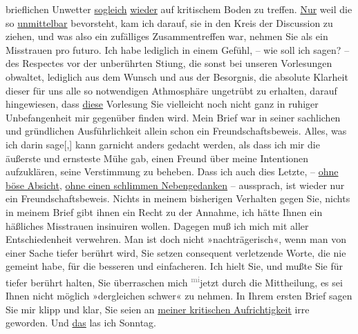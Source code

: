 \begin{ledgroupsized}[t]{13cm}
               brieflichen Unwetter \uline{sogleich}{ }\uline{wieder} auf kritischem Boden zu treffen. \uline{Nur} weil die \label{K_L03355-3v}\label{K_L03355-3h} so \uline{unmittelbar} bevorsteht, kam ich darauf,
               sie in den Kreis der Discussion zu ziehen, und was also ein zufälliges
               Zusammentreffen war, nehmen Sie als ein Misstrauen pro futuro.\pend
           \pstart
           Ich habe lediglich in einem Gefühl, – wie soll ich sagen? – des Respectes vor der
               unberührten Sti{\geminationm}ung, die sonst bei unseren Vorlesungen
               obwaltet, lediglich aus dem Wunsch und aus der Besorgnis, die absolute Klarheit
               dieser für uns alle so notwendigen Athmosphäre ungetrübt zu erhalten, darauf
               hingewiesen, dass \uline{diese} Vorlesung Sie vielleicht noch
               nicht ganz in ruhiger Unbefangenheit mir gegenüber finden wird.\pend
           \pstart
           Mein Brief war in seiner sachlichen und gründlichen Ausführlichkeit allein schon ein
               Freundschaftsbeweis. Alles, was ich darin sage{[},{]} kann garnicht
               anders gedacht werden, als dass ich mir die äußerste und ernsteste Mühe gab, einen
               Freund über meine {\pb}Intentionen
               aufzuklären, seine Verstimmung zu beheben. Dass ich auch dies Letzte, – \uline{ohne böse Absicht}, \uline{ohne
                  einen schlimmen Nebengedanken} – aussprach, ist wieder nur ein
               Freundschaftsbeweis. Nichts in meinem bisherigen Verhalten gegen Sie, nichts in
               meinem Brief gibt ihnen ein Recht zu der Annahme, ich hätte Ihnen ein häßliches
               Misstrauen insinuiren wollen. Dagegen muß ich mich mit aller Entschiedenheit
               verwehren.\pend
           \pstart
           Man ist doch nicht »nachträgerisch«, wenn man von einer Sache tiefer berührt wird,
               Sie setzen consequent verletzende Worte, die  nie
               gemeint habe, für die besseren und einfacheren.\pend
           \pstart
           Ich hielt Sie, und mußte Sie für tiefer berührt halten, Sie überraschen mich \substVorne{}\textsuperscript{\textcolor{gray}{mi}}\substDazwischen{}jetzt\substHinten{} durch die Mittheilung, es sei Ihnen nicht möglich »dergleichen schwer« zu
               nehmen.\pend
           \pstart
           In Ihrem ersten Brief sagen Sie mir klipp und klar, Sie seien an \uline{meiner kritischen Aufrichtigkeit} irre geworden. Und \uline{das} las ich Sonntag.

\end{ledgroupsized}
